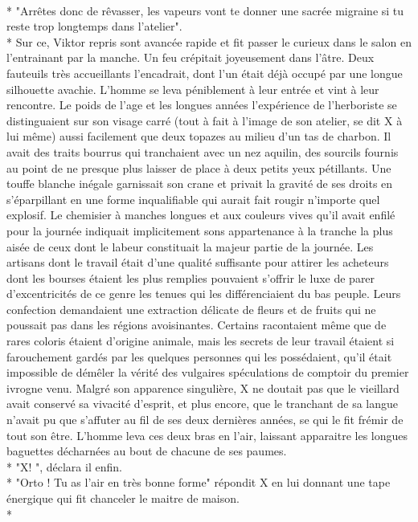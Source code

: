 \documentclass{book}
\begin{document}
\\* "Arrêtes donc de rêvasser, les vapeurs vont te donner une sacrée migraine si tu reste trop longtemps dans l'atelier". \\* 
Sur ce, Viktor repris sont avancée rapide et fit passer le curieux dans le salon en l'entrainant par la manche. Un feu crépitait joyeusement dans l'âtre. Deux fauteuils très accueillants l'encadrait, dont l'un était déjà occupé par une longue silhouette avachie.
L'homme se leva péniblement à leur entrée et vint à leur rencontre.
Le poids de l'age et les longues années l’expérience de l'herboriste se distinguaient sur son visage carré (tout à fait à l'image de son atelier, se dit X à lui même) aussi facilement que deux topazes au milieu d'un tas de charbon. Il avait des traits bourrus qui tranchaient avec un nez aquilin, des sourcils fournis au point de ne presque plus laisser de place à deux petits yeux pétillants. Une touffe blanche inégale garnissait son crane et privait la gravité de ses droits en s'éparpillant en une forme inqualifiable qui aurait fait rougir n'importe quel explosif. 
Le chemisier à manches longues et aux couleurs vives qu'il avait enfilé pour la journée indiquait implicitement sons appartenance à la tranche la plus aisée de ceux dont le labeur constituait la majeur partie de la journée. Les artisans dont le travail était d'une qualité suffisante pour attirer les acheteurs dont les bourses étaient les plus remplies pouvaient s'offrir le luxe de parer d'excentricités de ce genre les tenues qui les différenciaient du bas peuple. Leurs confection demandaient une extraction délicate de fleurs et de fruits qui ne poussait pas dans les régions avoisinantes. Certains racontaient même que de rares coloris étaient d'origine animale, mais les secrets de leur travail étaient si farouchement gardés par les quelques personnes qui les possédaient, qu'il était impossible de démêler la vérité des vulgaires spéculations de comptoir du premier ivrogne venu. Malgré son apparence singulière, X ne doutait pas que le vieillard avait conservé sa vivacité d'esprit, et plus encore, que le tranchant de sa langue n'avait pu que s'affuter au fil de ses deux dernières années, se qui le fit frémir de tout son être.  L'homme leva ces deux bras en l'air, laissant apparaitre les longues baguettes décharnées au bout de chacune de ses paumes. \\*
"X! ", déclara il enfin. \\*
"Orto ! Tu as l'air en très bonne forme" répondit X en lui donnant une tape énergique qui fit chanceler le maitre de maison.\\*
\end{document}
